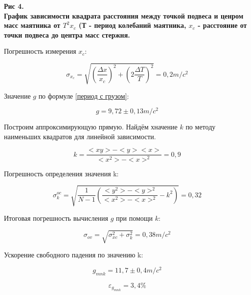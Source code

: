 \begin{flushright}
{\scriptsize \textbf{Рис 4.}\\ \textbf {График зависимости квадрата расстояния между точкой подвеса и ценром масс маятника от $T^2x_c$ (Т - период колебаний маятника, $x_c$ - расстояние от точки подвеса до центра масс стержня.}}
\end{flushright}

    Погрешность измерения $x_c$:
    
\[\sigma_{x_c} = \sqrt{\left(\frac{\Delta x}{x_c}\right)^2 + \left(2\frac{\Delta T}{T}\right)^2} = 0,2 m/c^2\]

    Значение $g$ по формуле \eqref{период с грузом}:
    
\[g = 9,72 \pm 0,13 m/c^2\]


    Построим аппроксимирующую прямую. Найдём хначение $k$ по методу наименьших квадратов для линейной зависимости.
    
\[k = \frac{<xy> - <y><x>}{<x^2> - <x>^2} = 0,9\]    
    
    Погрешность определения значения k:
    
\[\sigma_{k}^{oc} = \sqrt{\frac{1}{N-1} \left(\frac{<y^2> - <y>^2}{<x^2> - <x>^2} - k^2\right)} = 0,32\]


    Итоговая погрешность вычисления $g$ при помощи $k$:
    
\[\sigma_{ov} = \sqrt{\sigma_{xc}^2 + \sigma_k^2} =  0,38 m/c^2\]


    Ускорение свободного падения по значению k:
    
\[g_{mnk} = 11,7 \pm  0,4 m/c^2\]

\[\varepsilon_{g_{mnk}} = 3,4\%\]



